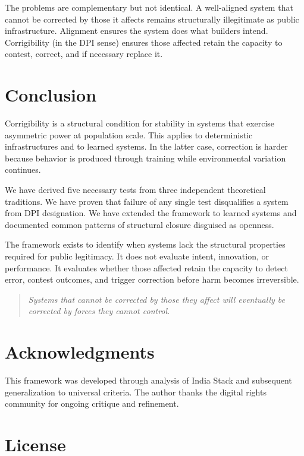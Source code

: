 \documentclass[11pt,a4paper]{article}
\begin{document}
The problems are complementary but not identical. A well-aligned system that cannot be corrected by those it affects remains structurally illegitimate as public infrastructure. Alignment ensures the system does what builders intend. Corrigibility (in the DPI sense) ensures those affected retain the capacity to contest, correct, and if necessary replace it.

\section{Conclusion}

Corrigibility is a structural condition for stability in systems that exercise asymmetric power at population scale. This applies to deterministic infrastructures and to learned systems. In the latter case, correction is harder because behavior is produced through training while environmental variation continues.

We have derived five necessary tests from three independent theoretical traditions. We have proven that failure of any single test disqualifies a system from DPI designation. We have extended the framework to learned systems and documented common patterns of structural closure disguised as openness.

The framework exists to identify when systems lack the structural properties required for public legitimacy. It does not evaluate intent, innovation, or performance. It evaluates whether those affected retain the capacity to detect error, contest outcomes, and trigger correction before harm becomes irreversible.

\begin{quote}
\textit{Systems that cannot be corrected by those they affect will eventually be corrected by forces they cannot control.}
\end{quote}

\section*{Acknowledgments}

This framework was developed through analysis of India Stack and subsequent generalization to universal criteria. The author thanks the digital rights community for ongoing critique and refinement.

\section*{License}
\end{document}
